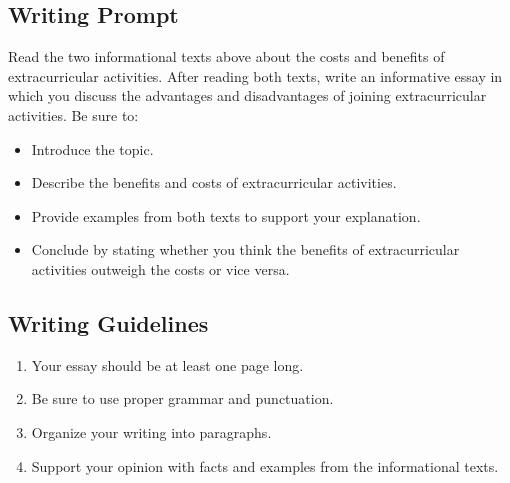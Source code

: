 \documentclass[12pt]{article}
\begin{document}
\subsection*{Writing Prompt}

Read the two informational texts above about the costs and benefits of extracurricular activities. After reading both texts, write an informative essay in which you discuss the advantages and disadvantages of joining extracurricular activities. Be sure to:

\begin{itemize}
    \item Introduce the topic.
    \item Describe the benefits and costs of extracurricular activities.
    \item Provide examples from both texts to support your explanation.
    \item Conclude by stating whether you think the benefits of extracurricular activities outweigh the costs or vice versa.
\end{itemize}

\subsection*{Writing Guidelines}

\begin{enumerate}
    \item Your essay should be at least one page long.
    \item Be sure to use proper grammar and punctuation.
    \item Organize your writing into paragraphs.
    \item Support your opinion with facts and examples from the informational texts.
\end{enumerate}
\end{document}

